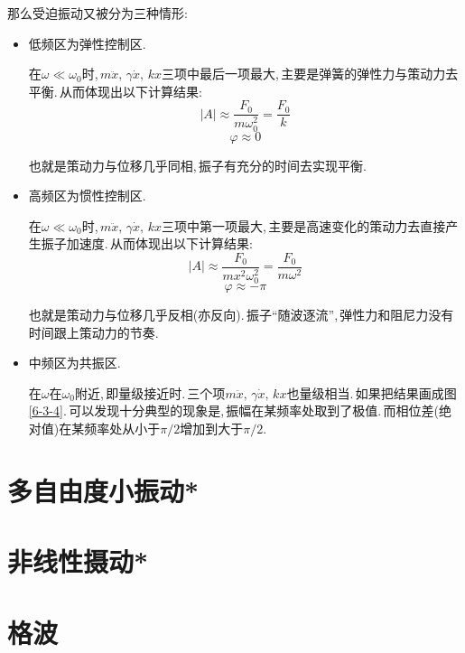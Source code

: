 那么受迫振动又被分为三种情形:

\begin{itemize}
	\item 低频区为弹性控制区.

	在$\omega\ll\omega_0$时,\,$m\ddot{x},\,\gamma\dot{x},\,kx$三项中最后一项最大,\,主要是弹簧的弹性力与策动力去平衡.\,从而体现出以下计算结果:
	\[|A|\approx \frac{F_0}{m\omega_0^2}=\frac{F_0}{k}\]
	\[\varphi\approx 0\]

	也就是策动力与位移几乎同相,\,振子有充分的时间去实现平衡.

	\item 高频区为惯性控制区.

	在$\omega\ll\omega_0$时,\,$m\ddot{x},\,\gamma\dot{x},\,kx$三项中第一项最大,\,主要是高速变化的策动力去直接产生振子加速度.\,从而体现出以下计算结果:
	\[|A|\approx \frac{F_0}{mx^2\omega_0^2}=\frac{F_0}{m\omega^2}\]
	\[\varphi\approx -\pi\]

	也就是策动力与位移几乎反相(亦反向).\,振子``随波逐流'',\,弹性力和阻尼力没有时间跟上策动力的节奏.

	\item 中频区为共振区.

	在$\omega$在$\omega_0$附近,\,即量级接近时.\,三个项$m\ddot{x},\,\gamma\dot{x},\,kx$也量级相当.\,如果把结果画成图\ref{6-3-4}.\,可以发现十分典型的现象是,\,振幅在某频率处取到了极值.\,而相位差(绝对值)在某频率处从小于$\pi/2$增加到大于$\pi/2$.
\end{itemize}


\section{多自由度小振动*}

\section{非线性摄动*}

\section{格波}



